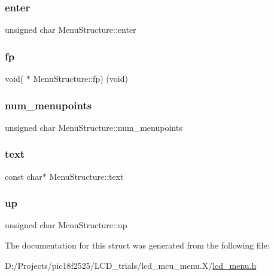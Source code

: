 \subsubsection{\texorpdfstring{enter}{enter}}
{\footnotesize\ttfamily unsigned char Menu\+Structure\+::enter}

\mbox{\label{struct_menu_structure_a9fa7771424c33bfa30bf05f7fdcc4a1a}} 
\subsubsection{\texorpdfstring{fp}{fp}}
{\footnotesize\ttfamily void( $\ast$ Menu\+Structure\+::fp) (void)}

\mbox{\label{struct_menu_structure_a03bb2b81933329456adb5a4dd4e6ee68}} 
\subsubsection{\texorpdfstring{num\_menupoints}{num\_menupoints}}
{\footnotesize\ttfamily unsigned char Menu\+Structure\+::num\+\_\+menupoints}

\mbox{\label{struct_menu_structure_a0726774a008bbbd0740ce033cd5b7c7a}} 
\subsubsection{\texorpdfstring{text}{text}}
{\footnotesize\ttfamily const char$\ast$ Menu\+Structure\+::text}

\mbox{\label{struct_menu_structure_ac983323a9dfb0e5b141bd9f06c7f2d94}} 
\subsubsection{\texorpdfstring{up}{up}}
{\footnotesize\ttfamily unsigned char Menu\+Structure\+::up}



The documentation for this struct was generated from the following file\+:\begin{DoxyCompactItemize}
\item 
D\+:/\+Projects/pic18f2525/\+L\+C\+D\+\_\+trials/lcd\+\_\+mcu\+\_\+menu.\+X/\mbox{\hyperlink{lcd__menu_8h}{lcd\+\_\+menu.\+h}}\end{DoxyCompactItemize}

